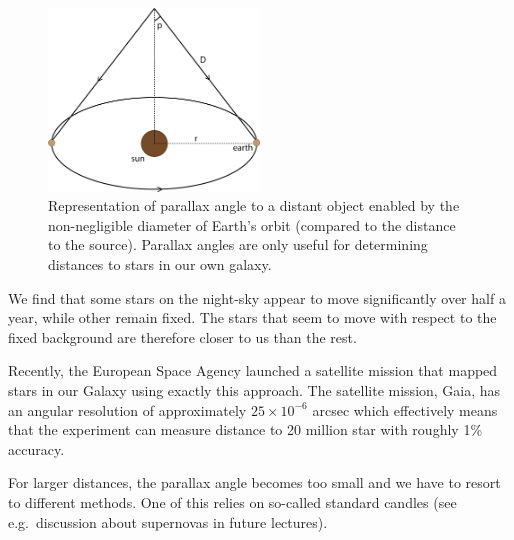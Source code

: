 \documentclass[a4paper,12pt]{article}
\theoremstyle{remark}
\renewcommand{\=}[1]{\stackrel{#1}{=}} %
\theoremstyle{plain}
\theoremstyle{definition}
\begin{document}

\begin{figure}[t]
\begin{center}
    \includegraphics*[angle=0,width=0.5\textwidth]{img/parallax.png}
    \caption[Insert text]{Representation of parallax angle to a distant object enabled by the non-negligible diameter of Earth's orbit (compared to the distance to the source). Parallax angles are only useful for determining distances to stars in our own galaxy.}
\label{fig:parallax}
\end{center}
\end{figure}

We find that some stars on the night-sky appear to move significantly over half a year, while other remain fixed. The stars that seem to move with respect to the fixed background are therefore closer to us than the rest.

Recently, the European Space Agency launched a satellite mission that mapped stars in our Galaxy using exactly this approach. The satellite mission, Gaia, has an angular resolution of approximately $25 \times 10^{-6}$ arcsec which effectively means that the experiment can measure distance to 20 million star with roughly 1\% accuracy.

For larger distances, the parallax angle becomes too small and we have to resort to different methods. One of this relies on so-called standard candles (see e.g.\ discussion about supernovas in future lectures).
\end{document}
